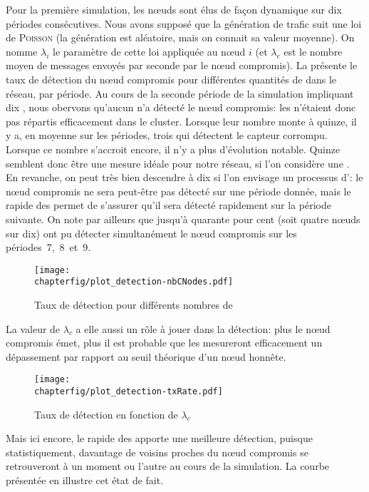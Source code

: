 Pour la première simulation, les nœuds sont élus de façon dynamique sur dix périodes consécutives.
Nous avons supposé que la génération de trafic suit une loi de \textsc{Poisson} (la génération est aléatoire, mais on connait sa valeur moyenne).
On nomme $\lambda_i$ le paramètre de cette loi appliquée au nœud $i$ (et $\lambda_c$ est le nombre moyen de messages envoyés par seconde par le nœud compromis).
La  présente le taux de détection du nœud compromis pour différentes quantités de \cns dans le réseau, par période.
Au cours de la seconde période de la simulation impliquant dix \cns, nous obervons qu'aucun \cn n'a détecté le nœud compromis: les \cns n'étaient donc pas répartis efficacement dans le cluster.
Lorsque leur nombre monte à quinze, il y a, en moyenne sur les périodes, trois \cns qui détectent le capteur corrompu.
Lorsque ce nombre s'accroit encore, il n'y a plus d'évolution notable.
Quinze \cns semblent donc être une mesure idéale pour notre réseau, si l'on considère une \elecstat.
En revanche, on peut très bien descendre à dix \cns si l'on envisage un processus d'\elecdyn: le nœud compromis ne sera peut-être pas détecté sur une période donnée, mais le  rapide des \cns permet de s'assurer qu'il sera détecté rapidement sur la période suivante.
On note par ailleurs que jusqu'à quarante pour cent (soit quatre nœuds sur dix) ont pu détecter simultanément le nœud compromis sur les périodes~7,~8~et~9.
\begin{figure}[ht]
    \centering
    \texttt{[image: \\chapterfig/plot\_detection-nbCNodes.pdf]}
    \caption{Taux de détection pour différents nombres de \cns}\label{sa:fig:detec-nbcn}
\end{figure}

La valeur de $\lambda_c$ a elle aussi un rôle à jouer dans la détection: plus le nœud compromis émet, plus il est probable que les \cns mesureront efficacement un dépassement par rapport au seuil théorique d'un nœud honnête.
\begin{figure}[ht]
    \centering
    \texttt{[image: \\chapterfig/plot\_detection-txRate.pdf]}
    \caption{Taux de détection en fonction de $\lambda_c$}\label{sa:fig:detection-txRate}
\end{figure}
Mais ici encore, le  rapide des \cns apporte une meilleure détection, puisque statistiquement, davantage de voisins proches du nœud compromis se retrouveront \cns à un moment ou l'autre au cours de la simulation.
La courbe présentée en  illustre cet état de fait.

